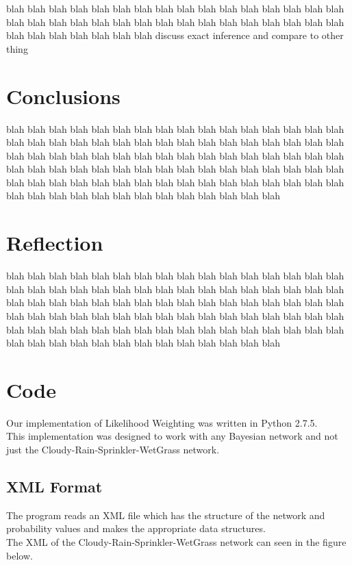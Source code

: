 \documentclass{article}
\begin{document}
blah blah blah blah blah blah blah blah blah blah blah blah blah blah blah blah blah blah blah blah blah blah blah blah blah blah blah blah blah blah blah blah blah blah blah blah blah blah blah discuss exact inference and compare to other thing

\section{Conclusions}
blah blah blah blah blah blah blah blah blah blah blah blah blah blah blah blah blah blah blah blah blah blah blah blah blah blah blah blah blah blah blah blah blah blah blah blah blah blah blah blah blah blah blah blah blah blah blah blah blah blah blah blah blah blah blah blah blah blah blah blah blah blah blah blah blah blah blah blah blah blah blah blah blah blah blah blah blah blah blah blah blah blah blah blah blah blah blah blah blah blah blah blah blah 

\section{Reflection}
blah blah blah blah blah blah blah blah blah blah blah blah blah blah blah blah blah blah blah blah blah blah blah blah blah blah blah blah blah blah blah blah blah blah blah blah blah blah blah blah blah blah blah blah blah blah blah blah blah blah blah blah blah blah blah blah blah blah blah blah blah blah blah blah blah blah blah blah blah blah blah blah blah blah blah blah blah blah blah blah blah blah blah blah blah blah blah blah blah blah blah blah blah 

\section{Code}
Our implementation of Likelihood Weighting was written in Python 2.7.5.\\

This implementation was designed to work with any Bayesian network and not just the Cloudy-Rain-Sprinkler-WetGrass network.

\subsection{XML Format}
The program reads an XML file which has the structure of the network and probability values and makes the appropriate data structures.\\

The XML of the Cloudy-Rain-Sprinkler-WetGrass network can seen in the figure below.
\end{document}
